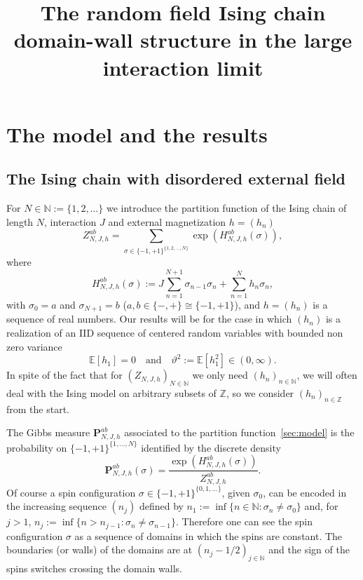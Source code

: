 \documentclass[AHL,Unicode,longabstracts,published]{cedram}
\title[The large interaction RFIC]{The random field Ising chain domain-wall structure in the large interaction limit}
\author[\initial{O.} \lastname{Collin}]{\firstname{Orphée} \lastname{Collin}}
\author[\initial{G.} \lastname{Giacomin}]{\firstname{Giambattista} \lastname{Giacomin}}
\author[\initial{Y.} \lastname{Hu}]{\firstname{Yueyun} \lastname{Hu}}
\newcommand{\bP}{\mathbf{P}}
\newcommand{\bbE}{\mathbb{E}}
\newcommand{\bbN}{\mathbb{N}}
\newcommand{\bbZ}{\mathbb{Z}}
\newcommand{\gs}{\sigma}
\begin{document}
\maketitle


\section{The model and the results}\label{sec:intro}

\subsection{The Ising chain with disordered external field}\label{sec:model}

For $N\in \bbN:=\{1,2, \dots\}$ we introduce the partition function of the Ising chain of length $N$, interaction $J$ and external magnetization $h=(h_n)$
\begin{equation}\label{eq:ZRFIC}
Z_{N, J, h}^{ab}=
\sum_{\gs \in \{-1, +1\}^{\{1,2,\dots, N\}}} \exp\left(H^{ab}_{N, J, h}(\gs)\right),
\end{equation}
where
\begin{equation}\label{eq:HRFIC}
H^{ab}_{N, J, h}(\gs) := J\sum_{n=1}^{N+1} \gs _{n-1} \gs_{n} + \sum_{n=1}^{N} h_n \gs_n,
\end{equation}
with $\gs_0=a$ and $\gs_{N+1}=b$ ($a,b \in\{ -, +\}\cong\{-1,+1\}$), and $h=(h_n)$ is a sequence of real numbers. Our results will be for the case in which $(h_n)$ is a realization of an IID sequence of centered random variables with bounded non zero variance
\begin{equation}\label{hyp-S}
\bbE[h_1]=0 \quad \text{and}\quad \vartheta^2:= \bbE\left[h_1^2\right] \in (0, \infty).
\end{equation}
In spite of the fact that for $(Z_{N, J, h})_{N \in \bbN}$ we only need $(h_n)_{n \in \bbN}$, we will often deal with the Ising model on arbitrary subsets of $\bbZ$, so we consider $(h_n)_{n \in \bbZ}$ from the start.



The Gibbs measure $\bP^{ab}_{N, J, h}$ associated to the partition function~\eqref{sec:model} is the probability on $\{-1, +1\}^{\{1,\dots, N\}}$ identified by the discrete density
\begin{equation}\label{eq:Gibbs}
\bP^{ab}_{N, J, h}\left(\gs \right) = \frac{\exp\left(H^{ab}_{N, J, h}(\gs)\right) }{Z_{N, J, h}^{ab}} .
\end{equation}
Of course a spin configuration $\gs \in \{-1,+1\}^{\{0,1,\dots\}}$, given $\gs_0$, can be encoded in the increasing sequence $(n_j)$ defined by $n_1:=
\inf\{n\in \bbN: \gs_n\neq \gs_0\}$ and, for $j>1$, $n_j:=\inf\{n > n_{j-1}: \gs_n \neq \gs_{n-1}\}$. Therefore one can see the spin configuration $\gs$ as a sequence of domains in which the spins are constant. The boundaries (or walls) of the domains are at $(n_j-1/2)_{j \in \bbN}$ and the sign of the spins switches crossing the domain walls.
\end{document}
